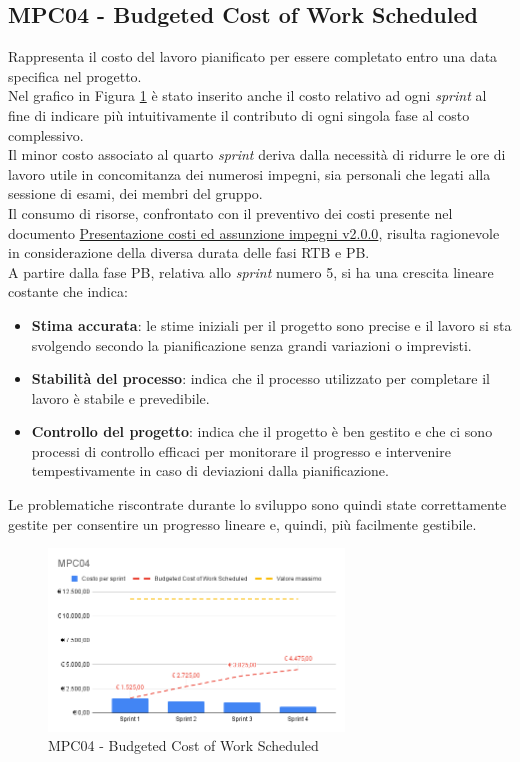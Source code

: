 \newpage
\subsection{MPC04 - Budgeted Cost of Work Scheduled}
\label{s:mpc04}
Rappresenta il costo del lavoro pianificato per essere completato entro una data specifica nel progetto.\\
Nel grafico in Figura \ref{fig:mpc04} è stato inserito anche il costo relativo ad ogni \textit{sprint} al fine di indicare più intuitivamente il contributo di ogni singola fase al costo complessivo.\\
Il minor costo associato al quarto \textit{sprint} deriva dalla necessità di ridurre le ore di lavoro utile in concomitanza dei numerosi impegni, sia personali che legati alla sessione di esami, dei membri del gruppo.\\
Il consumo di risorse, confrontato con il preventivo dei costi presente nel documento \href{https://project-swenergy.github.io/Candidatura/Presentazione%20costi%20e%20assunzione%20impegni.pdf}{Presentazione costi ed assunzione impegni v2.0.0}, risulta ragionevole in considerazione della diversa durata delle fasi RTB e PB.\\
A partire dalla fase PB, relativa allo \textit{sprint} numero 5, si ha una crescita lineare costante che indica:
\begin{itemize}
    \item \textbf{Stima accurata}: le stime iniziali per il progetto sono precise e il lavoro si sta svolgendo secondo la pianificazione senza grandi variazioni o imprevisti.
    \item \textbf{Stabilità del processo}: indica che il processo utilizzato per completare il lavoro è stabile e prevedibile.
    \item \textbf{Controllo del progetto}: indica che il progetto è ben gestito e che ci sono processi di controllo efficaci per monitorare il progresso e intervenire tempestivamente in caso di deviazioni dalla pianificazione.
\end{itemize} 
Le problematiche riscontrate durante lo sviluppo sono quindi state correttamente gestite per consentire un progresso lineare e, quindi, più facilmente gestibile.

\begin{figure}[htbp]
    \centering
    \includegraphics[width=0.7\textwidth]{img/MPC04.png}
    \caption{MPC04 - Budgeted Cost of Work Scheduled}
    \label{fig:mpc04}
\end{figure}

